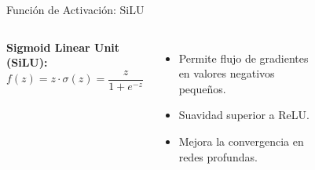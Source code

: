 \documentclass[aspectratio=169]{beamer}
\begin{document}
	\begin{frame}{Función de Activación: SiLU}
		\begin{columns}
			\textbf{Sigmoid Linear Unit (SiLU):}
			\begin{equation}
				f(z) = z \cdot \sigma(z) = \frac{z}{1+e^{-z}}
			\end{equation}
			\begin{itemize}
				\item Permite flujo de gradientes en valores negativos pequeños.
				\item Suavidad superior a ReLU.
				\item Mejora la convergencia en redes profundas.
			\end{itemize}
			
			\begin{figure}
				\centering
			\end{figure}
		\end{columns}
	\end{frame}
	
\end{document}

